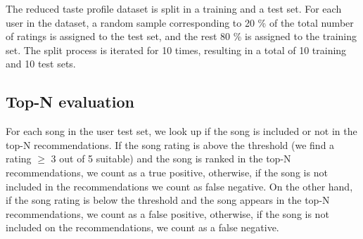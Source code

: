 \documentclass{article}
\begin{document}
The reduced taste profile dataset is split in a training and a test set. For each user in the dataset, a random sample corresponding to 20 \% of the total number of ratings is assigned to the test set, and the rest 80 \% is assigned to the training set. The split process is iterated for 10 times, resulting in a total of 10 training and 10 test sets.

\subsection{Top-N evaluation}
For each song in the user test set, we look up if the song is included or not in the top-N recommendations. If the song rating is above the threshold (we find a rating $\geq$ 3 out of 5 suitable) and the song is ranked in the top-N recommendations, we count as a true positive, otherwise, if the song is not included in the recommendations we count as false negative. On the other hand, if the song rating is below the threshold and the song appears in the top-N recommendations, we count as a false positive, otherwise, if the song is not included on the recommendations, we count as a false negative.

\end{document}
